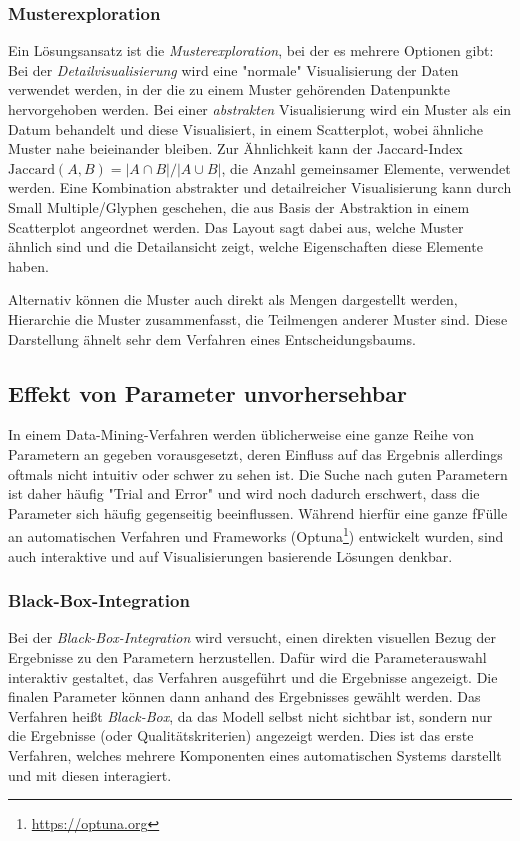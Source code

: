 			\subsubsection{Musterexploration}
				Ein Lösungsansatz ist die \emph{Musterexploration}, bei der es mehrere Optionen gibt: Bei der \emph{Detailvisualisierung} wird eine "normale" Visualisierung der Daten verwendet werden, in der die zu einem Muster gehörenden Datenpunkte hervorgehoben werden. Bei einer \emph{abstrakten} Visualisierung wird ein Muster als ein Datum behandelt und diese Visualisiert, \bspw in einem Scatterplot, wobei ähnliche Muster nahe beieinander bleiben. Zur Ähnlichkeit kann \bspw der Jaccard-Index \( \mathrm{Jaccard}(A, B) = \lvert A \cap B \rvert / \lvert A \cup B \rvert \), \dh die Anzahl gemeinsamer Elemente, verwendet werden. Eine Kombination abstrakter und detailreicher Visualisierung kann \zB durch Small Multiple/Glyphen geschehen, die aus Basis der Abstraktion in einem Scatterplot angeordnet werden. Das Layout sagt dabei aus, welche Muster ähnlich sind und die Detailansicht zeigt, welche Eigenschaften diese Elemente haben.

				Alternativ können die Muster auch direkt als Mengen dargestellt werden, \zB Hierarchie die Muster zusammenfasst, die Teilmengen anderer Muster sind. Diese Darstellung ähnelt sehr dem Verfahren eines Entscheidungsbaums.

		\subsection{Effekt von Parameter unvorhersehbar}
			In einem Data-Mining-Verfahren werden üblicherweise eine ganze Reihe von Parametern an gegeben vorausgesetzt, deren Einfluss auf das Ergebnis allerdings oftmals nicht intuitiv oder schwer zu sehen ist. Die Suche nach guten Parametern ist daher häufig "Trial and Error" und wird noch dadurch erschwert, dass die Parameter sich häufig gegenseitig beeinflussen. Während hierfür eine ganze fFülle an automatischen Verfahren und Frameworks (\zB Optuna\footnote{\url{https://optuna.org}}) entwickelt wurden, sind auch interaktive und auf Visualisierungen basierende Lösungen denkbar.

			\subsubsection{Black-Box-Integration}
				Bei der \emph{Black-Box-Integration} wird versucht, einen direkten visuellen Bezug der Ergebnisse zu den Parametern herzustellen. Dafür wird die Parameterauswahl interaktiv gestaltet, das Verfahren ausgeführt und die Ergebnisse angezeigt. Die finalen Parameter können dann anhand des Ergebnisses gewählt werden. Das Verfahren heißt \emph{Black-Box}, da das Modell selbst nicht sichtbar ist, sondern nur die Ergebnisse (oder Qualitätskriterien) angezeigt werden. Dies ist das erste Verfahren, welches mehrere Komponenten eines automatischen Systems darstellt und mit diesen interagiert.

